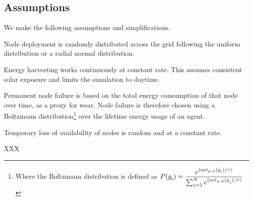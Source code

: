	\subsection{Assumptions}
	We make the following assumptions and simplifications.
	\begin{itemize}{
			\item Node deployment is randomly distributed across the grid following the uniform distribution or a radial normal distribution.
			\item Energy harvesting works continuously at constant rate. This assumes consistent solar exposure and limits the simulation to daytime.
			\item Permanent node failure is based on the total energy consumption of that node over time, as a proxy for wear. Node failure is therefore chosen using a Boltzmann distribution\footnote{Where the Boltzmann distribution is defined as $\functionBoltzmannEnergy{}{}$} over the lifetime energy usage of an agent.
			\item Temporary loss of availability of nodes is random and at a constant rate.
		}
	\end{itemize}
	
	
	
	
	\begin{definition}[Energy]
		XXX
	\end{definition}
	
	